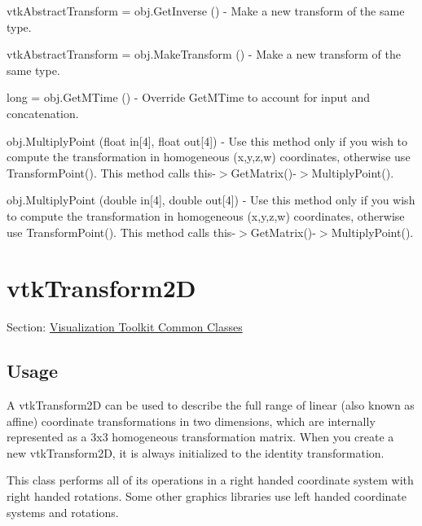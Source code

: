 \begin{DoxyItemize}
\item {\ttfamily vtk\-Abstract\-Transform = obj.\-Get\-Inverse ()} -\/ Make a new transform of the same type.  
\item {\ttfamily vtk\-Abstract\-Transform = obj.\-Make\-Transform ()} -\/ Make a new transform of the same type.  
\item {\ttfamily long = obj.\-Get\-M\-Time ()} -\/ Override Get\-M\-Time to account for input and concatenation.  
\item {\ttfamily obj.\-Multiply\-Point (float in\mbox{[}4\mbox{]}, float out\mbox{[}4\mbox{]})} -\/ Use this method only if you wish to compute the transformation in homogeneous (x,y,z,w) coordinates, otherwise use Transform\-Point(). This method calls this-\/$>$Get\-Matrix()-\/$>$Multiply\-Point().  
\item {\ttfamily obj.\-Multiply\-Point (double in\mbox{[}4\mbox{]}, double out\mbox{[}4\mbox{]})} -\/ Use this method only if you wish to compute the transformation in homogeneous (x,y,z,w) coordinates, otherwise use Transform\-Point(). This method calls this-\/$>$Get\-Matrix()-\/$>$Multiply\-Point().  
\end{DoxyItemize}\hypertarget{vtkcommon_vtktransform2d}{}\section{vtk\-Transform2\-D}\label{vtkcommon_vtktransform2d}
Section\-: \hyperlink{sec_vtkcommon}{Visualization Toolkit Common Classes} \hypertarget{vtkwidgets_vtkxyplotwidget_Usage}{}\subsection{Usage}\label{vtkwidgets_vtkxyplotwidget_Usage}
A vtk\-Transform2\-D can be used to describe the full range of linear (also known as affine) coordinate transformations in two dimensions, which are internally represented as a 3x3 homogeneous transformation matrix. When you create a new vtk\-Transform2\-D, it is always initialized to the identity transformation.

This class performs all of its operations in a right handed coordinate system with right handed rotations. Some other graphics libraries use left handed coordinate systems and rotations.

